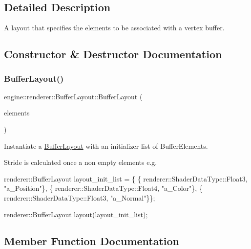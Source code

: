 \subsection{Detailed Description}
A layout that specifies the elements to be associated with a vertex buffer. 

\subsection{Constructor \& Destructor Documentation}
\mbox{\label{classengine_1_1renderer_1_1BufferLayout_aad7d69ca7a55c528fd619bc2f51635f0}} 
\subsubsection{\texorpdfstring{Buffer\+Layout()}{BufferLayout()}}
{\footnotesize\ttfamily engine\+::renderer\+::\+Buffer\+Layout\+::\+Buffer\+Layout (\begin{DoxyParamCaption}\item[{const std\+::initializer\+\_\+list$<$ \hyperlink{structengine_1_1renderer_1_1BufferElement}{Buffer\+Element} $>$ \&}]{elements }\end{DoxyParamCaption})\hspace{0.3cm}{\ttfamily [inline]}}



Instantiate a \hyperlink{classengine_1_1renderer_1_1BufferLayout}{Buffer\+Layout} with an initializer list of Buffer\+Elements. 

Stride is calculated once a non empty elements e.\+g. 
\begin{DoxyCode}
renderer::BufferLayout layout\_init\_list = \{
    \{ renderer::ShaderDataType::Float3, \textcolor{stringliteral}{"a\_Position"}\},
    \{ renderer::ShaderDataType::Float4, \textcolor{stringliteral}{"a\_Color"}\},
    \{ renderer::ShaderDataType::Float3, \textcolor{stringliteral}{"a\_Normal"}\}\};

renderer::BufferLayout layout(layout\_init\_list);
\end{DoxyCode}
 

\subsection{Member Function Documentation}
\mbox{\label{classengine_1_1renderer_1_1BufferLayout_abf525eed067da7cfa637c9fe795767b5}} 
